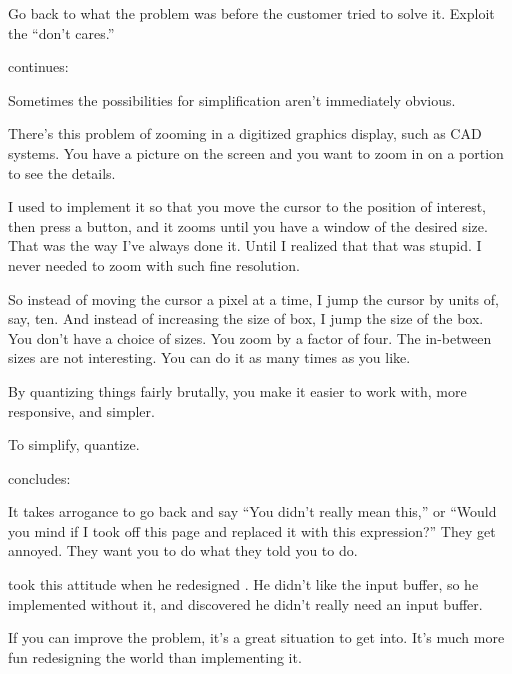 \begin{tip}
Go back to what the problem was before the customer tried to solve it.
Exploit the ``don't cares.''
\end{tip}




\begin{interview}
 continues:

\begin{tfquot}
Sometimes the possibilities for simplification aren't immediately
obvious.

There's this problem of zooming in a digitized graphics display, such
as CAD systems. You have a picture on the screen and you want to zoom
in on a portion to see the details.

I used to implement it so that you move the cursor to the position of
interest, then press a button, and it zooms until you have a window of
the desired size. That was the way I've always done it. Until I
realized that that was stupid. I never needed to zoom with such fine
resolution.

So instead of moving the cursor a pixel at a time, I jump the cursor
by units of, say, ten. And instead of increasing the size of box, I
jump the size of the box. You don't have a choice of sizes. You zoom
by a factor of four. The in-between sizes are not interesting. You can
do it as many times as you like.

By quantizing things fairly brutally, you make it easier to work with,
more responsive, and simpler.
\end{tfquot}
\end{interview}

\begin{tip}
To simplify, quantize.
\end{tip}

\begin{interview}
 concludes:%
\begin{tfquot}
It takes arrogance to go back and say ``You didn't really mean this,''
or ``Would you mind if I took off this page and replaced it with this
expression?'' They get annoyed. They want you to do what they told you
to do.

 took this attitude when he redesigned \Forth{}
\cite{stuart80}. He didn't like the input buffer, so he implemented
\Forth{} without it, and discovered he didn't really need an input buffer.%

If you can improve the problem, it's a great situation to get into.
It's much more fun redesigning the world than implementing it.
\end{tfquot}
\end{interview}


